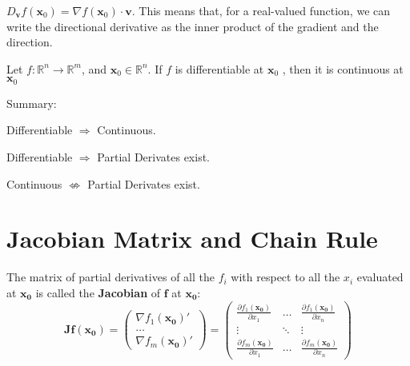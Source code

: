 \begin{remark*}
    \(D_{\mathbf{v}}f(\mathbf{x}_0) = \nabla f(\mathbf{x}_0) \cdot \mathbf{v}\). This means that, for a real-valued function, we can write the directional derivative as the inner product of the gradient and the direction.
\end{remark*}


\begin{proposition}
    Let \(f:\mathbb{R}^{n}\longrightarrow \mathbb{R}^{m}\), and \(\mathbf{x}_{0}\in \mathbb{R}^{n}\). If \(f\) is differentiable at \(\mathbf{x}_{0}\) , then it is continuous at \(\mathbf{x}_{0}\)
\end{proposition}

\begin{remark*} Summary:

    Differentiable $\Longrightarrow$ Continuous.

    Differentiable $\Longrightarrow$ Partial Derivates exist.

    Continuous $\nLeftrightarrow$ Partial Derivates exist.
\end{remark*}



\section{Jacobian Matrix and Chain Rule}

\begin{definition}
    The matrix of partial derivatives of all the $f_i$ with respect to all the $x_i$ evaluated at $\mathbf{x_0}$ is called the \textbf{Jacobian} of $\mathbf{f}$ at $\mathbf{x_0}$: \[
        \mathbf{Jf(x_0)} = \begin{pmatrix}
            \nabla f_1(\mathbf{x_0})' \\ \dots \\ \nabla f_m(\mathbf{x_0})'
        \end{pmatrix} = \begin{pmatrix}
            \frac{\partial f_1(\mathbf{x_0})}{\partial x_1} & \dots  & \frac{\partial f_1(\mathbf{x_0})}{\partial x_n} \\
            \vdots                                          & \ddots & \vdots                                          \\
            \frac{\partial f_m(\mathbf{x_0})}{\partial x_1} & \dots  & \frac{\partial f_m(\mathbf{x_0})}{\partial x_n}
        \end{pmatrix}
    \]
\end{definition}

